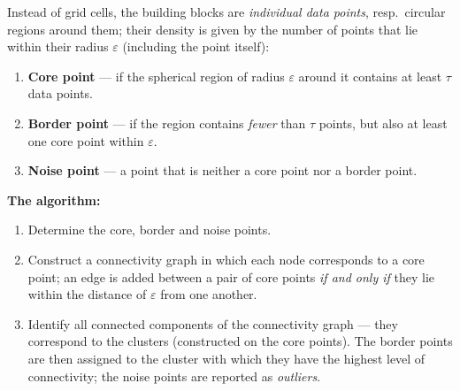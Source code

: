 \documentclass[11pt,a4paper]{article}
\theoremstyle{definition}
\begin{document}
\begin{defbox}
Instead of grid cells, the building blocks are \emph{individual data points}, resp.\ circular
regions around them; their density is given by the number of points that lie within their radius
$\varepsilon$ (including the point itself):
\begin{enumerate}
\item \textbf{Core point} --- if the spherical region of radius $\varepsilon$ around it contains at
      least $\tau$ data points.
\item \textbf{Border point} --- if the region contains \emph{fewer} than $\tau$ points, but also at
      least one core point within $\varepsilon$.
\item \textbf{Noise point} --- a point that is neither a core point nor a border point.
\end{enumerate}

\textbf{The algorithm:}
\begin{enumerate}
\item Determine the core, border and noise points.
\item Construct a connectivity graph in which each node corresponds to a core point; an edge is
      added between a pair of core points \emph{if and only if} they lie within the distance of
      $\varepsilon$ from one another.
\item Identify all connected components of the connectivity graph --- they correspond to the
      clusters (constructed on the core points). The border points are then assigned to the cluster
      with which they have the highest level of connectivity; the noise points are reported as
      \emph{outliers}.
\end{enumerate}
\end{defbox}
\end{document}
